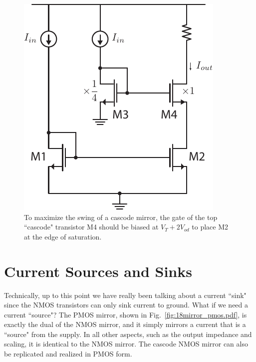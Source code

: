 \begin{figure}[tb]
\begin{center}
\includegraphics[scale=1]{mirror_cascode_hiswing.pdf}
\end{center}
\caption{To maximize the swing of a cascode mirror, the gate of the top ``cascode" transistor M4 should be biased at $V_T + 2 V_{od}$ to place M2 at the edge of saturation.} \label{fig:cascode_hiswing}
\end{figure}
 








\section{Current Sources and Sinks}


Technically, up to this point we have really been talking about a current ``sink" since the NMOS transistors can only sink current to ground.  What if we need a current ``source"?  The PMOS mirror, shown in Fig.~\ref{fig:18mirror_pmos.pdf}, is exactly the dual of the NMOS mirror, and it simply mirrors a current that is a ``source" from the supply.  In all other aspects, such as the output impedance and scaling, it is identical to the NMOS mirror.  The cascode NMOS mirror can also be replicated and realized in PMOS form. 
 





